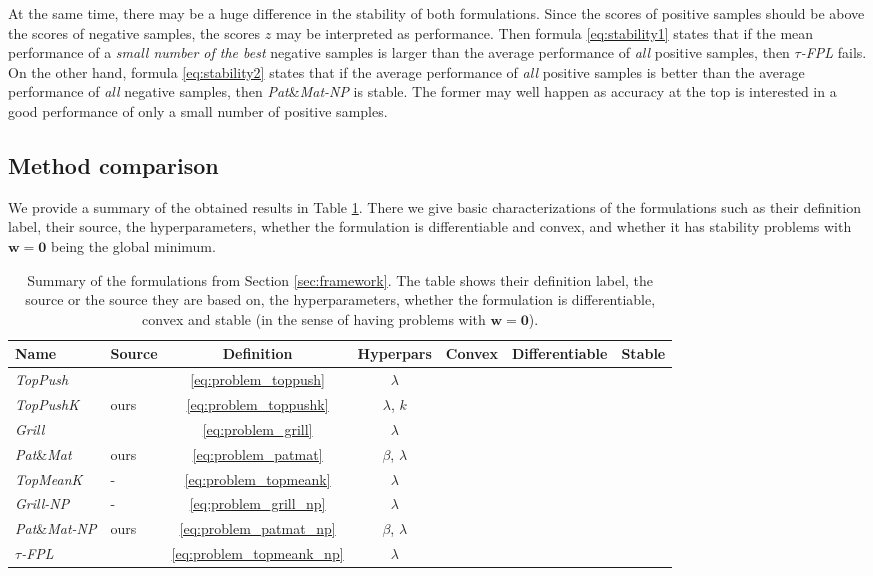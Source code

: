\documentclass{Thesis}
\newcommand{\cmark}{{\color{mgreen} \ding{51}}}%
\newcommand{\xmark}{{\color{mred} \ding{55}}}
\newcommand{\TopPush}{\emph{TopPush}\xspace}
\newcommand{\TopPushK}{\emph{TopPushK}\xspace}
\newcommand{\tauFPL}{{\emph{$\tau$-FPL}}\xspace}
\newcommand{\TopMeanK}{\emph{TopMeanK}\xspace}
\newcommand{\PatMat}{\emph{Pat}\&\emph{Mat}\xspace}
\newcommand{\PatMatNP}{{\emph{Pat}\&\emph{Mat-NP}}\xspace}
\newcommand{\Grill}{\emph{Grill}\xspace}
\newcommand{\GrillNP}{\emph{Grill-NP}\xspace}
\begin{document}
At the same time, there may be a huge difference in the stability of both formulations. Since the scores of positive samples should be above the scores of negative samples, the scores $z$ may be interpreted as performance. Then formula \eqref{eq:stability1} states that if the mean performance of a \emph{small number of the best} negative samples is larger than the average performance of \emph{all} positive samples, then \tauFPL fails. On the other hand, formula \eqref{eq:stability2} states that if the average performance of \emph{all} positive samples is better than the average performance of \emph{all} negative samples, then \PatMatNP is stable. The former may well happen as accuracy at the top is interested in a good performance of only a small number of positive samples. %


\subsection{Method comparison}

We provide a summary of the obtained results in Table \ref{tab:methods}. There we give basic characterizations of the formulations such as their definition label, their source, the hyperparameters, whether the formulation is differentiable and convex, and whether it has stability problems with $\bm{w}=\bm{0}$ being the global minimum. 

\begin{table}[!ht]
  \caption{Summary of the formulations from Section \ref{sec:framework}. The table shows their definition label, the source or the source they are based on, the hyperparameters, whether the formulation is differentiable, convex and stable (in the sense of having problems with $\bm{w}=\bm{0}$).}
  \label{tab:methods}
  \centering
  \begin{tabular}{ll ccccc}\toprule
    Name & Source & Definition & Hyperpars & Convex & Differentiable & Stable \\
    \midrule
    \TopPush & \cite{Li_TopPush} & \eqref{eq:problem_toppush}& $\lambda$ & \cmark & \xmark & \xmark\\
    \TopPushK & ours & \eqref{eq:problem_toppushk} & $\lambda$, $k$ & \cmark & \xmark & \xmark\\ 
    \Grill & \cite{Grill_2016} & \eqref{eq:problem_grill}  & $\lambda$ & \xmark & \xmark & \cmark\\
    \PatMat & ours & \eqref{eq:problem_patmat} & $\beta$, $\lambda$ & \cmark & \cmark & \cmark\\ 
    \TopMeanK & - & \eqref{eq:problem_topmeank} & $\lambda$ & \cmark & \xmark & \xmark\\ 
    \GrillNP & - & \eqref{eq:problem_grill_np} & $\lambda$ & \xmark & \xmark & \cmark\\
    \PatMatNP & ours & \eqref{eq:problem_patmat_np} & $\beta$, $\lambda$ & \cmark & \cmark & \cmark\\
    \tauFPL & \cite{zhang2018tau} & \eqref{eq:problem_topmeank_np} & $\lambda$ & \cmark & \xmark & \xmark\\
    \bottomrule
  \end{tabular}
\end{table}
\end{document}
